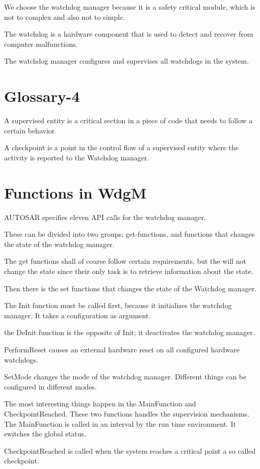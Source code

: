 \documentclass[a4paper]{article}
\begin{document}
We choose the watchdog manager because it is a safety critical module,
which is not to complex and also not to simple.

The watchdog is a hardware component that is used to detect and
recover from computer malfunctions.

The watchdog manager configures and supervises all watchdogs in the
system.

\section{Glossary-4}
A supervised entity is a critical section in a piece of code that
needs to follow a certain behavior.

A checkpoint is a point in the control flow of a supervised entity
where the activity is reported to the Watchdog manager.

\section{Functions in WdgM}
AUTOSAR specifies eleven API calls for the watchdog manager.

These can be divided into two groups; get-functions, and functions
that changes the state of the watchdog manager.

The get functions shall of course follow certain requirements, but the
will not change the state since their only task is to retrieve
information about the state.

Then there is the set functions that changes the state of the Watchdog
manager.

The Init function must be called first, because it initializes the
watchdog manager. It takes a configuration as argument.

the DeInit function is the opposite of Init; it deactivates the
watchdog manager.

PerformReset causes an external hardware reset on all configured
hardware watchdogs.

SetMode changes the mode of the watchdog manager. Different things can
be configured in different modes.

The most interesting things happen in the MainFunction and
CheckpointReached. These two functions handles the supervision mechanisms.
The MainFunction is called in an interval by the run time environment.
It switches the global status.

CheckpointReached is called when the system reaches a critical point a
so called checkpoint.
\end{document}
